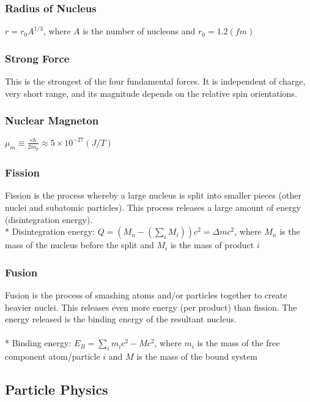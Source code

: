\subsubsection{Radius of Nucleus}
\(r=r_0A^{1/3}\), where \(A\) is the number of nucleons and \(r_0=1.2(fm)\)

\subsubsection{Strong Force}
This is the strongest of the four fundamental forces.
It is independent of charge, very short range, and its magnitude depends on the relative spin orientations.

\subsubsection{Nuclear Magneton}
\(\mu_m\equiv\frac{e\hbar}{2m_p}\approx5\times10^{-27}(J/T)\)

\subsubsection{Fission}
Fission is the process whereby a large nucleus is split into smaller pieces (other nuclei and subatomic particles).
This process releases a large amount of energy (disintegration energy).\\*
Disintegration energy: \(\displaystyle Q=\left(M_n-\left(\sum_iM_i\right)\right)c^2=\Delta mc^2\), where \(M_n\) is the mass of the nucleus before the split and \(M_i\) is the mass of product \(i\)

\subsubsection{Fusion}
Fusion is the process of smashing atoms and/or particles together to create heavier nuclei.
This releases even more energy (per product) than fission.
The energy released is the binding energy of the resultant nucleus.\\\\*
Binding energy: \(\displaystyle E_B=\sum_i{m_ic^2}-Mc^2\), where \(m_i\) is the mass of the free component atom/particle \(i\) and \(M\) is the mass of the bound system

\subsection{Particle Physics}


